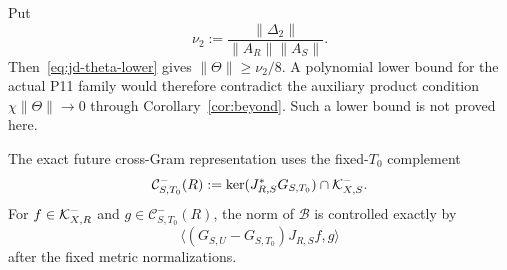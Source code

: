 Put
\[
 \nu_2:=\frac{\|\Delta_2\|}{\|A_R\|\|A_S\|}.
\tag{JD.17}\label{eq:jd-nu2}
\]
Then~\eqref{eq:jd-theta-lower} gives $\|\Theta\|\ge\nu_2/8$.
A polynomial lower bound for the actual P11 family would therefore contradict the
auxiliary product condition $\chi\|\Theta\|\to0$ through
Corollary~\ref{cor:beyond}.  Such a lower bound is not proved here.

The exact future cross-Gram representation uses the fixed-$T_0$ complement
\[
 \mathcal C^-_{S,T_0}(R)
 :=\ker(J_{R,S}^*G_{S,T_0})\cap\mathcal K_{X,S}^{-}.
\]
For $f\in\mathcal K_{X,R}^{-}$ and $g\in\mathcal C^-_{S,T_0}(R)$, the norm of $\mathscr B$ is
controlled exactly by
\[
 \langle(G_{S,U}-G_{S,T_0})J_{R,S}f,g\rangle
\]
after the fixed metric normalizations.